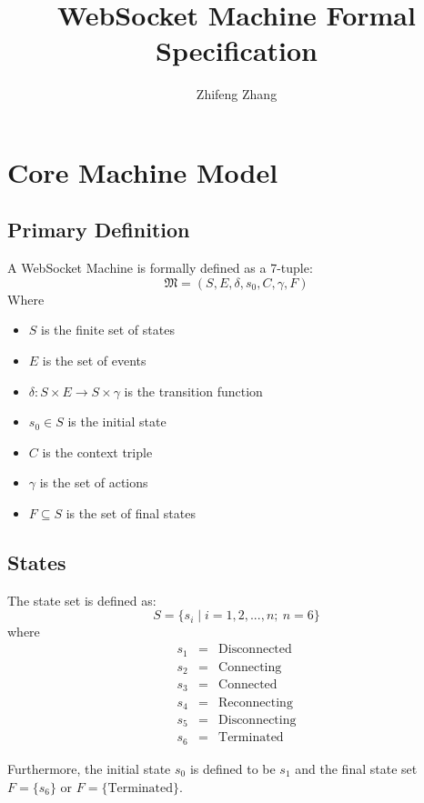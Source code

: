 \documentclass[10pt]{article}
\title{WebSocket Machine Formal Specification}
\author{Zhifeng Zhang}
\begin{document}
\maketitle
\tableofcontents
\newpage

\section{Core Machine Model}

\subsection{Primary Definition}
A WebSocket Machine is formally defined as a 7-tuple:
\[
\mathfrak{M} = (S, E, \delta, s_0, C, \gamma, F)
\]
Where
\begin{itemize}[leftmargin=2em]
\item $S$ is the finite set of states
\item $E$ is the set of events
\item $\delta: S \times E \rightarrow S \times \gamma$ is the transition function
\item $s_0 \in S$ is the initial state
\item $C$ is the context triple
\item $\gamma$ is the set of actions 
\item $F \subseteq S$ is the set of final states
\end{itemize}

\subsection{States}
The state set is defined as:
\[
S = \{s_i \mid i=1,2,...,n;\ n=6\}
\]
where
\begin{eqnarray*}
s_1 &=& \text{Disconnected} \\
s_2 &=& \text{Connecting} \\
s_3 &=& \text{Connected} \\
s_4 &=& \text{Reconnecting} \\
s_5 &=& \text{Disconnecting} \\
s_6 &=& \text{Terminated}
\end{eqnarray*}

Furthermore, the initial state $s_0$ is defined to be $s_1$ and the final state
set $F=\{s_6\}$ or $F=\{\text{Terminated}\}$.
\end{document}
